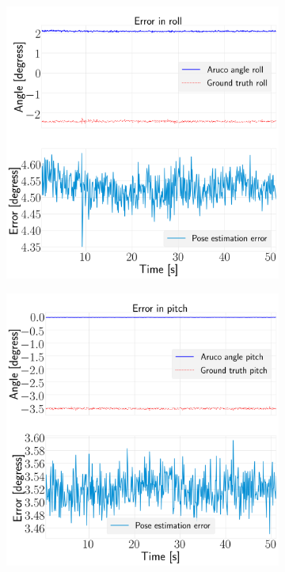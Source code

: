 \documentclass[../Head/report.tex]{subfiles}
\begin{document}
\begin{figure}[H]
\vspace{-1.5em}
    \centering
    \begin{subfigure}[t]{.30\textwidth}
        \centering
        \includegraphics[width=\textwidth]{../Figures/optitrack/steady_aruco_pose_estimation/pose_error_roll_test1.png}
        \caption{}
        \label{fig:optitrack_steady_state_pose_estimation_error_roll_test_five}
    \end{subfigure}
     \hspace{0.2em}
    \begin{subfigure}[t]{.30\textwidth}
        \centering
        \includegraphics[width=\textwidth]{../Figures/optitrack/steady_aruco_pose_estimation/pose_error_pitch_test1.png}

\end{subfigure}
\end{figure}
\end{document}
